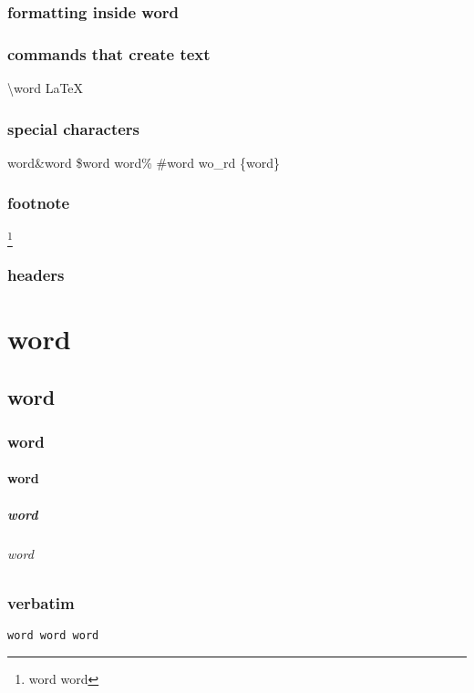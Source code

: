 \documentclass{article}
\begin{document}
\section{formatting inside word}

\section{commands that create text}
\textbackslash{}word \LaTeX{} %

\section{special characters}
word\&word \$word word\% \#word wo\_rd \{word\} %

\section{footnote}
\footnote{word word} %

\section{headers}
\part{word} %
\chapter{word} %
\section{word} %
\subsection{word} %
\subsubsection{word} %
\paragraph{word} %

\section{verbatim}
\verb|word word word| %
\end{document}
